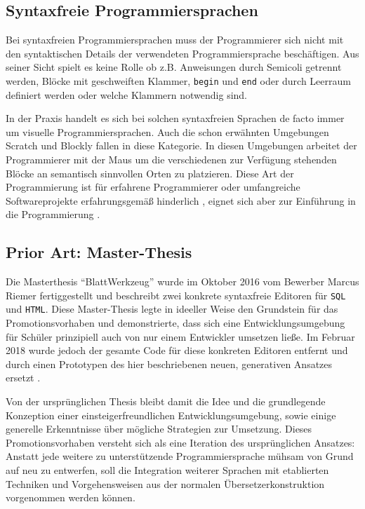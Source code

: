 \documentclass[paper=a4,fontsize=12pt,parskip=half]{scrartcl}
\begin{document}
\subsection{Syntaxfreie Programmiersprachen}

Bei syntaxfreien Programmiersprachen muss der Programmierer sich nicht mit den syntaktischen Details der verwendeten Programmiersprache beschäftigen. Aus seiner Sicht spielt es keine Rolle ob z.B. Anweisungen durch Semicoli getrennt werden, Blöcke mit geschweiften Klammer, \texttt{begin} und \texttt{end} oder durch Leerraum definiert werden oder welche Klammern notwendig sind.

In der Praxis handelt es sich bei solchen syntaxfreien Sprachen de facto immer um visuelle Programmiersprachen. Auch die schon erwähnten Umgebungen Scratch und Blockly fallen in diese Kategorie. In diesen Umgebungen arbeitet der Programmierer mit der Maus um die verschiedenen zur Verfügung stehenden Blöcke an semantisch sinnvollen Orten zu platzieren. Diese Art der Programmierung ist für erfahrene Programmierer oder umfangreiche Softwareprojekte erfahrungsgemäß hinderlich \cite[S. 262f]{schiffer_visuelle_2001}, eignet sich aber zur Einführung in die Programmierung \cite{resnick_scratch:_2009}.

\subsection{Prior Art: Master-Thesis}

Die Masterthesis \enquote{BlattWerkzeug} \cite{riemer_blattwerkzeug_2016}  wurde im Oktober 2016 vom Bewerber Marcus Riemer fertiggestellt und beschreibt zwei konkrete syntaxfreie Editoren für \texttt{SQL} und \texttt{HTML}. Diese Master-Thesis legte in ideeller Weise den Grundstein für das Promotionsvorhaben und demonstrierte, dass sich eine Entwicklungsumgebung für Schüler prinzipiell auch von nur einem Entwickler umsetzen ließe. Im Februar 2018 wurde jedoch der gesamte Code für diese konkreten Editoren entfernt und durch einen Prototypen des hier beschriebenen neuen, generativen Ansatzes ersetzt \cite{riemer_commit_2018}.

Von der ursprünglichen Thesis bleibt damit die Idee und die grundlegende Konzeption einer einsteigerfreundlichen Entwicklungsumgebung, sowie einige generelle Erkenntnisse über mögliche Strategien zur Umsetzung. Dieses Promotionsvorhaben versteht sich als eine Iteration des ursprünglichen Ansatzes: Anstatt jede weitere zu unterstützende Programmiersprache mühsam von Grund auf neu zu entwerfen, soll die Integration weiterer Sprachen mit etablierten Techniken und Vorgehensweisen aus der normalen Übersetzerkonstruktion vorgenommen werden können.
\end{document}
